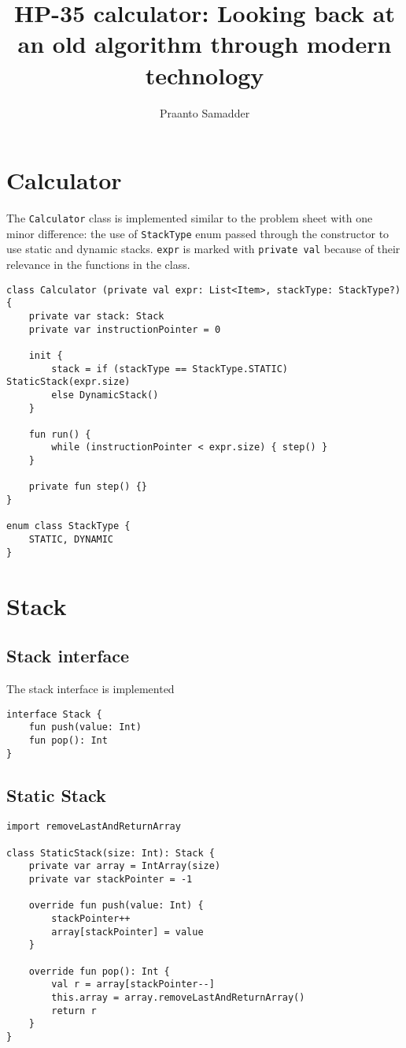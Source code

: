 \documentclass{article}
\title{HP-35 calculator: Looking back at an old algorithm through modern technology}
\author{Praanto Samadder}
\begin{document}
\maketitle



\section{Calculator}
The \texttt{Calculator} class is implemented similar to the problem sheet with one minor difference: the use of \texttt{StackType} enum passed through the constructor to use static and dynamic stacks. \texttt{expr} is marked with \texttt{private val} because of their relevance in the functions in the class.

\begin{verbatim}
class Calculator (private val expr: List<Item>, stackType: StackType?){
    private var stack: Stack
    private var instructionPointer = 0
    
    init {
        stack = if (stackType == StackType.STATIC) StaticStack(expr.size)
        else DynamicStack()
    }

    fun run() {
        while (instructionPointer < expr.size) { step() }
    }

    private fun step() {}
}

enum class StackType {
    STATIC, DYNAMIC
}

\end{verbatim}



\section{Stack}
\subsection{Stack interface}
The stack interface is implemented 

\begin{verbatim}
interface Stack {
    fun push(value: Int)
    fun pop(): Int
}
\end{verbatim}

\subsection{Static Stack}
\begin{verbatim}
import removeLastAndReturnArray

class StaticStack(size: Int): Stack {
    private var array = IntArray(size)
    private var stackPointer = -1

    override fun push(value: Int) {
        stackPointer++
        array[stackPointer] = value
    }

    override fun pop(): Int {
        val r = array[stackPointer--]
        this.array = array.removeLastAndReturnArray()
        return r
    }
}
\end{verbatim}
\end{document}
